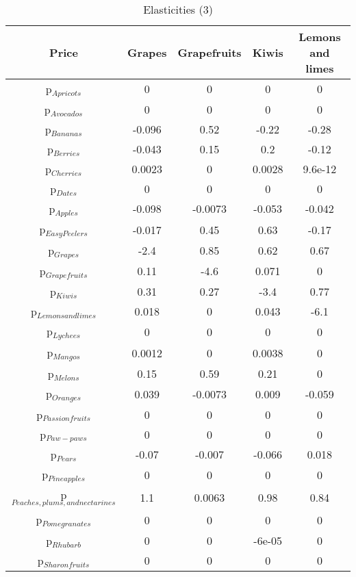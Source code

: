 \documentclass[11pt]{article}
\begin{document}
\begin{table}[h]
\caption{Elasticities (3)}
\label{Table: elasticities 3}
\begin{center}
\begin{tabular}{ccccc}
Price & Grapes & Grapefruits & Kiwis & Lemons and limes \\ \hline
p$_{Apricots}$ & 0 & 0 & 0 & 0 \\ 
p$_{Avocados}$ & 0 & 0 & 0 & 0 \\ 
p$_{Bananas}$ & -0.096 & 0.52 & -0.22 & -0.28 \\ 
p$_{Berries}$ & -0.043 & 0.15 & 0.2 & -0.12 \\ 
p$_{Cherries}$ & 0.0023 & 0 & 0.0028 & 9.6e-12 \\ 
p$_{Dates}$ & 0 & 0 & 0 & 0 \\ 
p$_{Apples}$ & -0.098 & -0.0073 & -0.053 & -0.042 \\ 
p$_{Easy Peelers}$ & -0.017 & 0.45 & 0.63 & -0.17 \\ 
p$_{Grapes}$ & -2.4 & 0.85 & 0.62 & 0.67 \\ 
p$_{Grapefruits}$ & 0.11 & -4.6 & 0.071 & 0 \\ 
p$_{Kiwis}$ & 0.31 & 0.27 & -3.4 & 0.77 \\ 
p$_{Lemons and limes}$ & 0.018 & 0 & 0.043 & -6.1 \\ 
p$_{Lychees}$ & 0 & 0 & 0 & 0 \\ 
p$_{Mangos}$ & 0.0012 & 0 & 0.0038 & 0 \\ 
p$_{Melons}$ & 0.15 & 0.59 & 0.21 & 0 \\ 
p$_{Oranges}$ & 0.039 & -0.0073 & 0.009 & -0.059 \\ 
p$_{Passion fruits}$ & 0 & 0 & 0 & 0 \\ 
p$_{Paw-paws}$ & 0 & 0 & 0 & 0 \\ 
p$_{Pears}$ & -0.07 & -0.007 & -0.066 & 0.018 \\ 
p$_{Pineapples}$ & 0 & 0 & 0 & 0 \\ 
p$_{Peaches, plums, and nectarines}$ & 1.1 & 0.0063 & 0.98 & 0.84 \\ 
p$_{Pomegranates}$ & 0 & 0 & 0 & 0 \\ 
p$_{Rhubarb}$ & 0 & 0 & -6e-05 & 0 \\ 
p$_{Sharon fruits}$ & 0 & 0 & 0 & 0 \\ 
\end{tabular}
\end{center}
\end{table}
\end{document}
